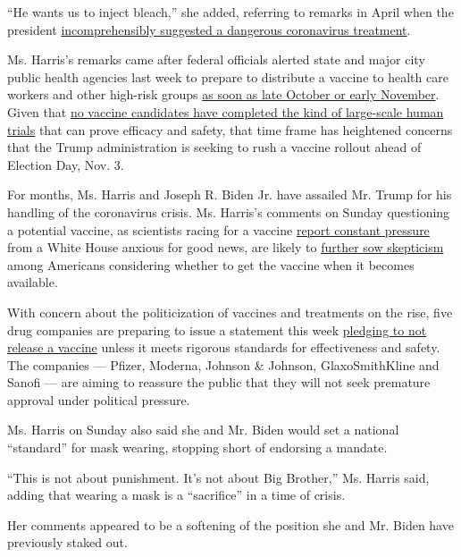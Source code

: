 ``He wants us to inject bleach,'' she added, referring to remarks in
April when the president
\href{https://www.nytimes3xbfgragh.onion/2020/04/26/us/politics/trump-disinfectant-coronavirus.html}{incomprehensibly
suggested a dangerous coronavirus treatment}.

Ms. Harris's remarks came after federal officials alerted state and
major city public health agencies last week to prepare to distribute a
vaccine to health care workers and other high-risk groups
\href{https://www.nytimes3xbfgragh.onion/2020/09/02/health/covid-19-vaccine-cdc-plans.html}{as
soon as late October or early November}. Given that
\href{https://www.nytimes3xbfgragh.onion/interactive/2020/science/coronavirus-vaccine-tracker.html}{no
vaccine candidates have completed the kind of large-scale human trials}
that can prove efficacy and safety, that time frame has heightened
concerns that the Trump administration is seeking to rush a vaccine
rollout ahead of Election Day, Nov. 3.

For months, Ms. Harris and Joseph R. Biden Jr. have assailed Mr. Trump
for his handling of the coronavirus crisis. Ms. Harris's comments on
Sunday questioning a potential vaccine, as scientists racing for a
vaccine
\href{https://www.nytimes3xbfgragh.onion/2020/08/02/us/politics/coronavirus-vaccine.html}{report
constant pressure} from a White House anxious for good news, are likely
to
\href{https://www.nytimes3xbfgragh.onion/2020/07/18/health/coronavirus-anti-vaccine.html}{further
sow skepticism} among Americans considering whether to get the vaccine
when it becomes available.

With concern about the politicization of vaccines and treatments on the
rise, five drug companies are preparing to issue a statement this week
\href{https://www.nytimes3xbfgragh.onion/2020/09/04/science/covid-vaccine-pharma-pledge.html}{pledging
to not release a vaccine} unless it meets rigorous standards for
effectiveness and safety. The companies --- Pfizer, Moderna, Johnson \&
Johnson, GlaxoSmithKline and Sanofi --- are aiming to reassure the
public that they will not seek premature approval under political
pressure.

Ms. Harris on Sunday also said she and Mr. Biden would set a national
``standard'' for mask wearing, stopping short of endorsing a mandate.

``This is not about punishment. It's not about Big Brother,'' Ms. Harris
said, adding that wearing a mask is a ``sacrifice'' in a time of crisis.

Her comments appeared to be a softening of the position she and Mr.
Biden have previously staked out.

